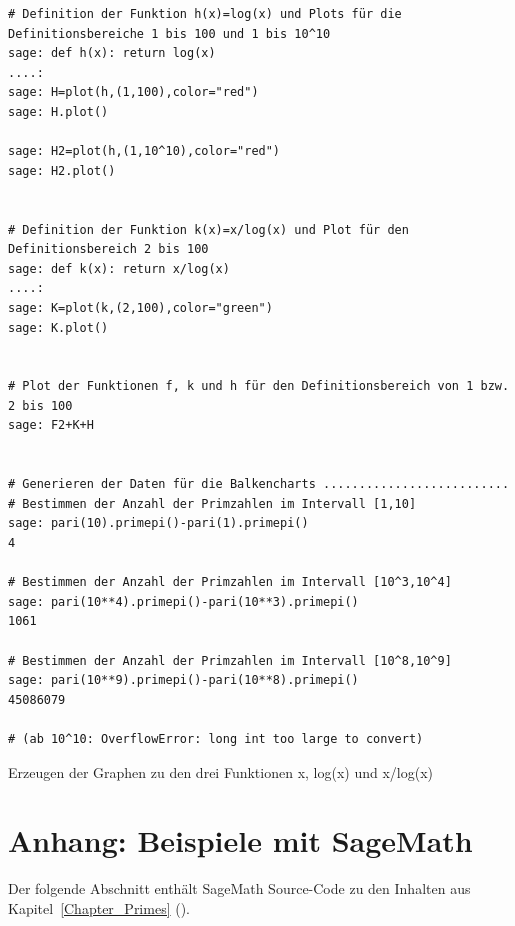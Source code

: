 \begin{refsegment}
\begin{sagecode}
\begin{Verbatim}
# Definition der Funktion h(x)=log(x) und Plots für die Definitionsbereiche 1 bis 100 und 1 bis 10^10
sage: def h(x): return log(x)
....:
sage: H=plot(h,(1,100),color="red")
sage: H.plot()

sage: H2=plot(h,(1,10^10),color="red")
sage: H2.plot()


# Definition der Funktion k(x)=x/log(x) und Plot für den Definitionsbereich 2 bis 100
sage: def k(x): return x/log(x)
....:
sage: K=plot(k,(2,100),color="green")
sage: K.plot()


# Plot der Funktionen f, k und h für den Definitionsbereich von 1 bzw. 2 bis 100
sage: F2+K+H


# Generieren der Daten für die Balkencharts ..........................
# Bestimmen der Anzahl der Primzahlen im Intervall [1,10]
sage: pari(10).primepi()-pari(1).primepi()
4

# Bestimmen der Anzahl der Primzahlen im Intervall [10^3,10^4]
sage: pari(10**4).primepi()-pari(10**3).primepi()
1061

# Bestimmen der Anzahl der Primzahlen im Intervall [10^8,10^9]
sage: pari(10**9).primepi()-pari(10**8).primepi()
45086079

# (ab 10^10: OverflowError: long int too large to convert)

\end{Verbatim}
\caption{Erzeugen der Graphen zu den drei Funktionen x, log(x) und x/log(x)}
\end{sagecode}




\clearpage
\newpage
\hypertarget{primes:_Appendix_Sage-Samples}{}
\section{Anhang: Beispiele mit SageMath}
\label{primes:_Appendix_Sage-Samples}

 Der folgende Abschnitt enthält SageMath Source-Code zu den Inhalten aus
Kapitel~\ref{Chapter_Primes} (\glqq {}\grqq).



\end{refsegment}
